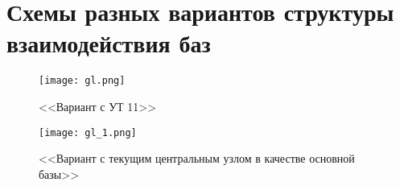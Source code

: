 \section{Схемы разных вариантов структуры взаимодействия баз}



	\begin{figure}[H]
		\texttt{[image: gl.png]}
		\caption{<<Вариант с УТ 11>>}
		\label{ris:gl.png}
	\end{figure}


	\begin{figure}[H]
		\texttt{[image: gl\_1.png]}
		\caption{<<Вариант с текущим центральным узлом в качестве основной базы>>}
		\label{ris:gl_1.png}
	\end{figure}

